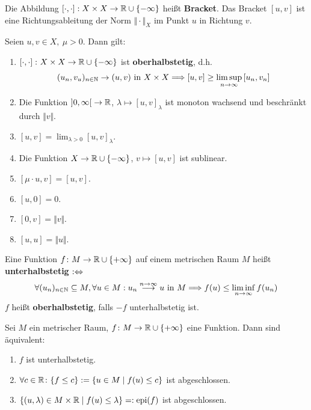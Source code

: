 Die Abbildung $[\cdot,\cdot]:X\times X\to\mathbb{R}\cup\lbrace-\infty\rbrace$ heißt \textbf{Bracket}. Das Bracket $[u,v]$ ist eine Richtungsableitung der Norm $\Vert\cdot\Vert_X$ im Punkt $u$ in Richtung $v$.

\begin{lemma}
Seien $u,v\in X,~\mu>0$. Dann gilt:
\begin{enumerate}[label=(\roman*)]
\item $\left[\cdot,\cdot\right]\colon X\times X\to\mathbb{R}\cup\lbrace-\infty\rbrace$ ist \textbf{oberhalbstetig}, d.h. 
\begin{align*}
(u_n,v_u)_{n\in\mathbb{N}}\to(u,v)\text{ in }X\times X\Longrightarrow\left[u,v\right]\geq\limsup_{n\to\infty}\left[u_n,v_n\right]
\end{align*}

	\item Die Funktion $\left]0,\infty\right[\to\mathbb{R}$, $\lambda\mapsto\left[u,v\right]_\lambda$ ist monoton wachsend und beschränkt durch $\Vert v\Vert$.
	\item $\left[u,v\right]=\lim_{\lambda>0}\left[u,v\right]_\lambda$.
	\item Die Funktion $X\to\mathbb{R}\cup\lbrace-\infty\rbrace$, $v\mapsto\left[u,v\right]$ ist sublinear.
	\item $\left[\mu\cdot u,v\right]=\left[u,v\right]$.
	\item $\left[u,0\right]=0$.
	\item $\left[0,v\right]=\Vert v\Vert$.
	\item $\left[u,u\right]=\Vert u\Vert$.
\end{enumerate}
\end{lemma}

\begin{definition}
Eine Funktion $f\colon M\to\mathbb{R}\cup\lbrace+\infty\rbrace$ auf einem metrischen Raum $M$ heißt \textbf{unterhalbstetig} $:\Leftrightarrow$
\begin{align*}
\forall(u_n)_{n\in\mathbb{N}}\subseteq M,\forall u\in M:
u_n\stackrel{n\to\infty}{\longrightarrow} u\text{ in }M
\Longrightarrow
f(u)\leq\liminf_{n\to\infty} f(u_n)
\end{align*}
$f$ heißt \textbf{oberhalbstetig}, falls $-f$ unterhalbstetig ist.
\end{definition}

\begin{lemma}
Sei $M$ ein metrischer Raum, $f\colon M\to\mathbb{R}\cup\lbrace+\infty\rbrace$ eine Funktion. Dann sind äquivalent: 
\begin{enumerate}[label=(\roman*)]
	\item $f$ ist unterhalbstetig.
	\item $\forall c\in\mathbb{R}\colon\lbrace f\leq c\rbrace:=\lbrace u\in M\mid f(u)\leq c\rbrace$ ist abgeschlossen.
	\item $\lbrace(u,\lambda)\in M\times\mathbb{R}\mid f(u)\leq\lambda\rbrace=:\operatorname{epi}(f)$ ist abgeschlossen.
\end{enumerate}
\end{lemma}

